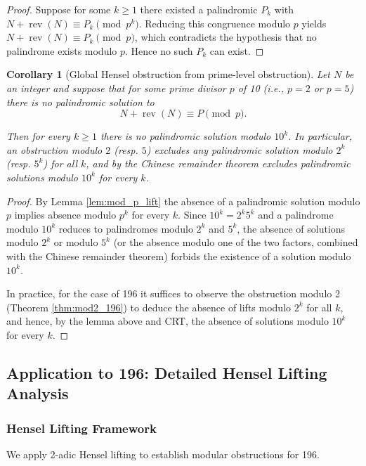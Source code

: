 \documentclass[11pt,a4paper]{article}
\theoremstyle{plain}
\newtheorem{corollary}[theorem]{Corollary}
\theoremstyle{definition}
\begin{document}
\begin{proof}
Suppose for some $k\ge1$ there existed a palindromic $P_k$ with
$N+\operatorname{rev}(N)\equiv P_k\pmod{p^k}$. Reducing this congruence modulo $p$ yields
$N+\operatorname{rev}(N)\equiv P_k\pmod p$, which contradicts the hypothesis that no palindrome exists modulo $p$. Hence no such $P_k$ can exist.
\end{proof}

\begin{corollary}[Global Hensel obstruction from prime-level obstruction]\label{cor:global_hensel}
Let $N$ be an integer and suppose that for some prime divisor $p$ of 10 (i.e., $p=2$ or $p=5$) there is no palindromic solution to
\[N+\operatorname{rev}(N)\equiv P\pmod p.\]

Then for every $k\ge1$ there is no palindromic solution modulo $10^k$. In particular, an obstruction modulo $2$ (resp. $5$) excludes any palindromic solution modulo $2^k$ (resp. $5^k$) for all $k$, and by the Chinese remainder theorem excludes palindromic solutions modulo $10^k$ for every $k$.
\end{corollary}

\begin{proof}
By Lemma \ref{lem:mod_p_lift} the absence of a palindromic solution modulo $p$ implies absence modulo $p^k$ for every $k$. Since $10^k=2^k5^k$ and a palindrome modulo $10^k$ reduces to palindromes modulo $2^k$ and $5^k$, the absence of solutions modulo $2^k$ or modulo $5^k$ (or the absence modulo one of the two factors, combined with the Chinese remainder theorem) forbids the existence of a solution modulo $10^k$.

In practice, for the case of 196 it suffices to observe the obstruction modulo 2 (Theorem \ref{thm:mod2_196}) to deduce the absence of lifts modulo $2^k$ for all $k$, and hence, by the lemma above and CRT, the absence of solutions modulo $10^k$ for every $k$.
\end{proof}

\subsection{Application to 196: Detailed Hensel Lifting Analysis}

\subsubsection{Hensel Lifting Framework}

We apply 2-adic Hensel lifting to establish modular obstructions for 196.
\end{document}
